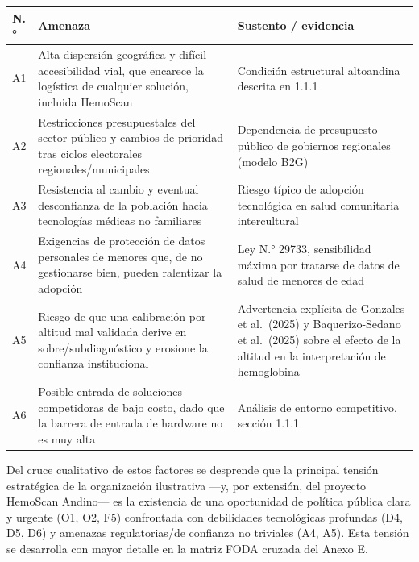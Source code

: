 \documentclass[11pt,a4paper]{article}
\begin{document}
{\small
\begin{longtable}[]{@{}
  >{\raggedright\arraybackslash}p{}
  >{\raggedright\arraybackslash}p{}
  >{\raggedright\arraybackslash}p{}@{}}
\toprule\noalign{}
\begin{minipage}[b]{\linewidth}\raggedright
N.°
\end{minipage} & \begin{minipage}[b]{\linewidth}\raggedright
Amenaza
\end{minipage} & \begin{minipage}[b]{\linewidth}\raggedright
Sustento / evidencia
\end{minipage} \\
\midrule\noalign{}
\endhead
\bottomrule\noalign{}
\endlastfoot
A1 & Alta dispersión geográfica y difícil accesibilidad vial, que encarece la logística de cualquier solución, incluida HemoScan & Condición estructural altoandina descrita en 1.1.1 \\
A2 & Restricciones presupuestales del sector público y cambios de prioridad tras ciclos electorales regionales/municipales & Dependencia de presupuesto público de gobiernos regionales (modelo B2G) \\
A3 & Resistencia al cambio y eventual desconfianza de la población hacia tecnologías médicas no familiares & Riesgo típico de adopción tecnológica en salud comunitaria intercultural \\
A4 & Exigencias de protección de datos personales de menores que, de no gestionarse bien, pueden ralentizar la adopción & Ley N.° 29733, sensibilidad máxima por tratarse de datos de salud de menores de edad \\
A5 & Riesgo de que una calibración por altitud mal validada derive en sobre/subdiagnóstico y erosione la confianza institucional & Advertencia explícita de Gonzales et al.~(2025) y Baquerizo-Sedano et al.~(2025) sobre el efecto de la altitud en la interpretación de hemoglobina \\
A6 & Posible entrada de soluciones competidoras de bajo costo, dado que la barrera de entrada de hardware no es muy alta & Análisis de entorno competitivo, sección 1.1.1 \\
\end{longtable}
}

Del cruce cualitativo de estos factores se desprende que la principal tensión estratégica de la organización ilustrativa ---y, por extensión, del proyecto HemoScan Andino--- es la existencia de una oportunidad de política pública clara y urgente (O1, O2, F5) confrontada con debilidades tecnológicas profundas (D4, D5, D6) y amenazas regulatorias/de confianza no triviales (A4, A5). Esta tensión se desarrolla con mayor detalle en la matriz FODA cruzada del Anexo E.
\end{document}
